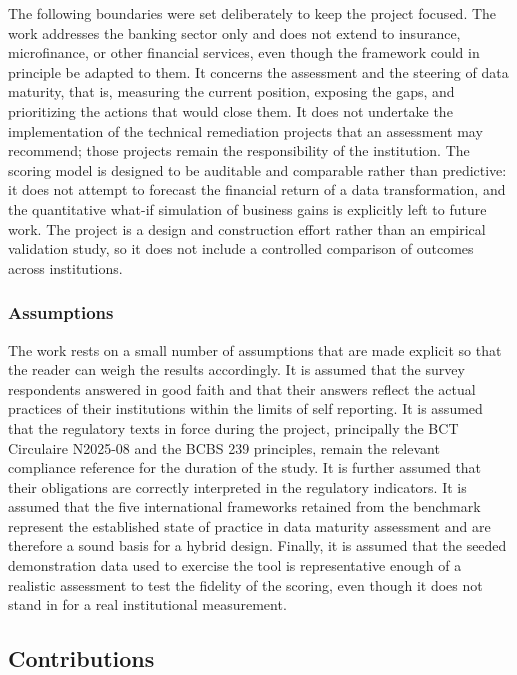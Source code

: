The following boundaries were set deliberately to keep the project focused. The work addresses the banking sector only and does not extend to insurance, microfinance, or other financial services, even though the framework could in principle be adapted to them. It concerns the assessment and the steering of data maturity, that is, measuring the current position, exposing the gaps, and prioritizing the actions that would close them. It does not undertake the implementation of the technical remediation projects that an assessment may recommend; those projects remain the responsibility of the institution. The scoring model is designed to be auditable and comparable rather than predictive: it does not attempt to forecast the financial return of a data transformation, and the quantitative what-if simulation of business gains is explicitly left to future work. The project is a design and construction effort rather than an empirical validation study, so it does not include a controlled comparison of outcomes across institutions.

\subsubsection{Assumptions}

The work rests on a small number of assumptions that are made explicit so that the reader can weigh the results accordingly. It is assumed that the survey respondents answered in good faith and that their answers reflect the actual practices of their institutions within the limits of self reporting. It is assumed that the regulatory texts in force during the project, principally the BCT Circulaire N\textdegree{}2025-08 and the BCBS 239 principles, remain the relevant compliance reference for the duration of the study. It is further assumed that their obligations are correctly interpreted in the regulatory indicators. It is assumed that the five international frameworks retained from the benchmark represent the established state of practice in data maturity assessment and are therefore a sound basis for a hybrid design. Finally, it is assumed that the seeded demonstration data used to exercise the tool is representative enough of a realistic assessment to test the fidelity of the scoring, even though it does not stand in for a real institutional measurement.

\subsection{Contributions}

